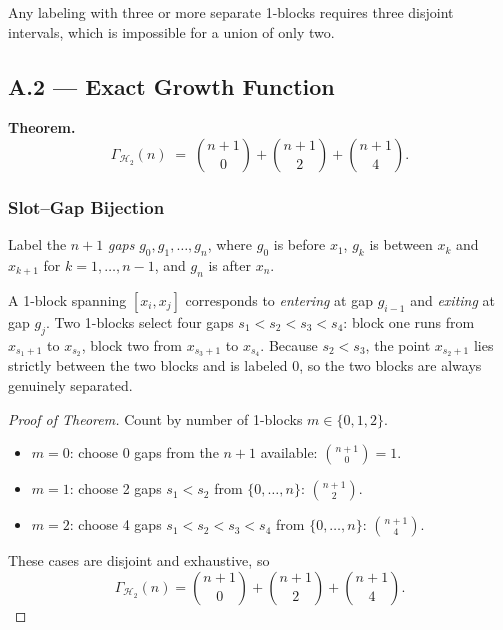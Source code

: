 \documentclass{article}
\begin{document}
\begin{remark}
Any labeling with three or more separate 1-blocks requires three disjoint
intervals, which is impossible for a union of only two.
\end{remark}
 
\subsection{A.2 --- Exact Growth Function}
 
\begin{summarybox}
\textbf{Theorem.}
\[
  \Gamma_{\mathcal{H}_2}(n)
  \;=\;
  \binom{n+1}{0}+\binom{n+1}{2}+\binom{n+1}{4}.
\]
\end{summarybox}
 
\subsubsection{Slot–Gap Bijection}
 
Label the $n+1$ \emph{gaps} $g_0,g_1,\dots,g_n$, where $g_0$ is before $x_1$,
$g_k$ is between $x_k$ and $x_{k+1}$ for $k=1,\dots,n-1$, and $g_n$ is after
$x_n$.
 
A 1-block spanning $[x_i,x_j]$ corresponds to \emph{entering} at gap $g_{i-1}$
and \emph{exiting} at gap $g_j$. Two 1-blocks select four gaps
$s_1<s_2<s_3<s_4$: block one runs from $x_{s_1+1}$ to $x_{s_2}$, block two
from $x_{s_3+1}$ to $x_{s_4}$. Because $s_2<s_3$, the point
$x_{s_2+1}$ lies strictly between the two blocks and is labeled 0, so the two
blocks are always genuinely separated.
 
\begin{proof}[Proof of Theorem]
Count by number of 1-blocks $m\in\{0,1,2\}$.
\begin{itemize}
  \item $m=0$: choose 0 gaps from the $n+1$ available:
        $\binom{n+1}{0}=1$.
  \item $m=1$: choose 2 gaps $s_1<s_2$ from $\{0,\dots,n\}$:
        $\binom{n+1}{2}$.
  \item $m=2$: choose 4 gaps $s_1<s_2<s_3<s_4$ from $\{0,\dots,n\}$:
        $\binom{n+1}{4}$.
\end{itemize}
These cases are disjoint and exhaustive, so
\[
  \Gamma_{\mathcal{H}_2}(n)=\binom{n+1}{0}+\binom{n+1}{2}+\binom{n+1}{4}.
\]
\end{proof}
 
\end{document}
